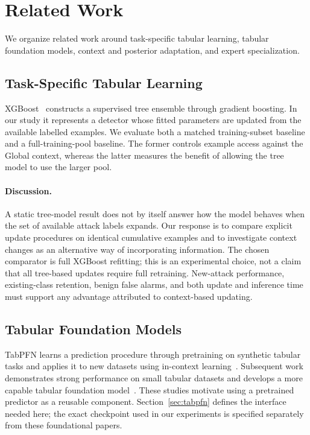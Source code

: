 \documentclass[sigconf,anonymous,pbalance]{acmart}
\begin{document}
\section{Related Work}
\label{sec:related}
We organize related work around task-specific tabular learning, tabular foundation models, context and posterior adaptation, and expert specialization.

\subsection{Task-Specific Tabular Learning}
XGBoost~\cite{chen2016xgboost} constructs a supervised tree ensemble through gradient boosting. In our study it represents a detector whose fitted parameters are updated from the available labelled examples. We evaluate both a matched training-subset baseline and a full-training-pool baseline. The former controls example access against the Global context, whereas the latter measures the benefit of allowing the tree model to use the larger pool.

\paragraph{Discussion.}
A static tree-model result does not by itself answer how the model behaves when the set of available attack labels expands. Our response is to compare explicit update procedures on identical cumulative examples and to investigate context changes as an alternative way of incorporating information. The chosen comparator is full XGBoost refitting; this is an experimental choice, not a claim that all tree-based updates require full retraining. New-attack performance, existing-class retention, benign false alarms, and both update and inference time must support any advantage attributed to context-based updating.

\subsection{Tabular Foundation Models}
TabPFN learns a prediction procedure through pretraining on synthetic tabular tasks and applies it to new datasets using in-context learning~\cite{hollmann2023tabpfn}. Subsequent work demonstrates strong performance on small tabular datasets and develops a more capable tabular foundation model~\cite{hollmann2025tabpfn}. These studies motivate using a pretrained predictor as a reusable component. Section~\ref{sec:tabpfn} defines the interface needed here; the exact checkpoint used in our experiments is specified separately from these foundational papers.
\end{document}
